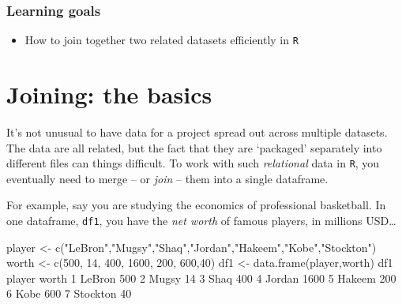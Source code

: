 \documentclass[
]{book}
\newenvironment{Shaded}{\begin{snugshade}}{\end{snugshade}}
\newcommand{\DecValTok}[1]{\textcolor[rgb]{0.00,0.00,0.81}{#1}}
\newcommand{\FunctionTok}[1]{\textcolor[rgb]{0.00,0.00,0.00}{#1}}
\newcommand{\NormalTok}[1]{#1}
\newcommand{\OtherTok}[1]{\textcolor[rgb]{0.56,0.35,0.01}{#1}}
\newcommand{\StringTok}[1]{\textcolor[rgb]{0.31,0.60,0.02}{#1}}
\providecommand{\tightlist}{%
  \setlength{\itemsep}{0pt}\setlength{\parskip}{0pt}}
\begin{document}
\hypertarget{learning-goals-14}{%
\subsubsection*{Learning goals}\label{learning-goals-14}}

\begin{itemize}
\tightlist
\item
  How to join together two related datasets efficiently in \texttt{R}
\end{itemize}

\hypertarget{joining-the-basics}{%
\section*{Joining: the basics}\label{joining-the-basics}}

It's not unusual to have data for a project spread out across multiple datasets. The data are all related, but the fact that they are `packaged' separately into different files can things difficult. To work with such \emph{relational} data in \texttt{R}, you eventually need to merge -- or \emph{join} -- them into a single dataframe.

For example, say you are studying the economics of professional basketball. In one dataframe, \texttt{df1}, you have the \emph{net worth} of famous players, in millions USD\ldots{}

\begin{Shaded}
\begin{Highlighting}[]
\NormalTok{player }\OtherTok{\textless{}{-}} \FunctionTok{c}\NormalTok{(}\StringTok{"LeBron"}\NormalTok{,}\StringTok{"Mugsy"}\NormalTok{,}\StringTok{"Shaq"}\NormalTok{,}\StringTok{"Jordan"}\NormalTok{,}\StringTok{"Hakeem"}\NormalTok{,}\StringTok{"Kobe"}\NormalTok{,}\StringTok{"Stockton"}\NormalTok{)}
\NormalTok{worth }\OtherTok{\textless{}{-}} \FunctionTok{c}\NormalTok{(}\DecValTok{500}\NormalTok{, }\DecValTok{14}\NormalTok{, }\DecValTok{400}\NormalTok{, }\DecValTok{1600}\NormalTok{, }\DecValTok{200}\NormalTok{, }\DecValTok{600}\NormalTok{,}\DecValTok{40}\NormalTok{)}
\NormalTok{df1 }\OtherTok{\textless{}{-}} \FunctionTok{data.frame}\NormalTok{(player,worth)}
\NormalTok{df1}
\NormalTok{    player worth}
\DecValTok{1}\NormalTok{   LeBron   }\DecValTok{500}
\DecValTok{2}\NormalTok{    Mugsy    }\DecValTok{14}
\DecValTok{3}\NormalTok{     Shaq   }\DecValTok{400}
\DecValTok{4}\NormalTok{   Jordan  }\DecValTok{1600}
\DecValTok{5}\NormalTok{   Hakeem   }\DecValTok{200}
\DecValTok{6}\NormalTok{     Kobe   }\DecValTok{600}
\DecValTok{7}\NormalTok{ Stockton    }\DecValTok{40}
\end{Highlighting}
\end{Shaded}
\end{document}
